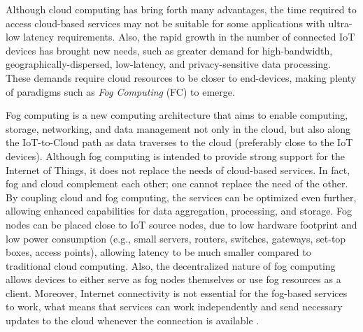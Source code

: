 \noindent\tab Although cloud computing has bring forth many advantages, the time required to access cloud-based services may not be suitable for some applications with ultra-low latency requirements. Also, the rapid growth in the number of connected IoT devices has brought new needs, such as greater demand for high-bandwidth, geographically-dispersed, low-latency, and privacy-sensitive data processing. These demands require cloud resources to be closer to end-devices, making plenty of paradigms such as \textit{Fog Computing} (FC) to emerge. %

\noindent\tab Fog computing is a new computing architecture that aims to enable computing, storage, networking, and data management not only in the cloud, but also along the IoT-to-Cloud path as data traverses to the cloud (preferably close to the IoT devices).
Although fog computing is intended to provide strong support for the Internet of Things, it does not replace the needs of cloud-based services. In fact, fog and cloud complement each other; one cannot replace the need of the other. By coupling cloud and fog computing, the services can be optimized even further, allowing enhanced capabilities for data aggregation, processing, and storage. Fog nodes can be placed close to IoT source nodes, due to low hardware footprint and low power consumption (e.g., small servers, routers, switches, gateways, set-top boxes, access points), allowing latency to be much smaller compared to traditional cloud computing. Also, the decentralized nature of fog computing allows devices to either serve as fog nodes themselves or use fog resources as a client. Moreover, Internet connectivity is not essential for the fog-based services to work, what means that services can work independently and send necessary updates to the cloud whenever the connection is available \cite{yousefpour2018all}.


